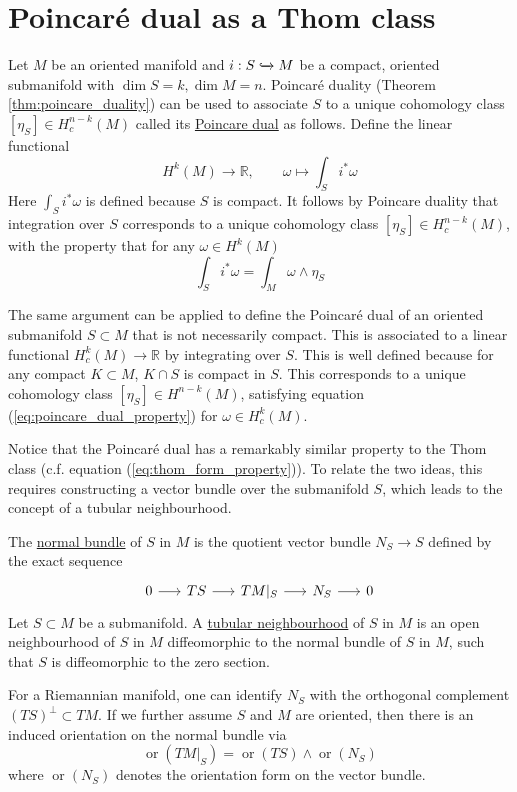 \section{Poincar\'e dual as a Thom class}
Let $M$ be an oriented manifold and $i: S \xhookrightarrow{} M$ be a compact,
oriented submanifold with $\dim S = k, \dim M = n$. 
Poincar\'e duality (Theorem \ref{thm:poincare_duality}) can be used to associate 
$S$ to a unique cohomology class $[\eta_S]\in H^{n-k}_c(M)$ called its
\underline{Poincare dual} as follows. Define the linear functional
\[
H^k(M) \to \mathbb{R}, \qquad 
\omega \mapsto \int_S i^*\omega
\] 
Here $\int_S i^*\omega$ is defined because $S$ is compact. 
It follows by Poincare duality that integration over $S$ corresponds to a
unique cohomology class $[\eta_S]\in H^{n-k}_c(M)$, with the property that 
for any $\omega\in H^k(M)$
\begin{equation} \label{eq:poincare_dual_property}
	\int_S i^*\omega = \int_M \omega \wedge \eta_S
\end{equation}
\begin{remark} %
	The same argument can be applied to define the Poincar\'e dual of an
	oriented submanifold $S \subset M$ that is not
	necessarily compact. This is associated to a linear functional 
	$H^k_c(M) \to \mathbb{R}$ by integrating over $S$. This is well defined
	because for any	compact $K\subset M$, $K\cap S$ is compact in $S$.
	This corresponds to a unique cohomology class $[\eta_S] \in H^{n-k}(M)$,
	satisfying equation (\ref{eq:poincare_dual_property}) for $\omega \in
	H^k_c(M)$.
\end{remark}
Notice that the Poincar\'e dual has a remarkably similar property to the 
Thom class (c.f. equation (\ref{eq:thom_form_property})). 
To relate the two ideas, this requires constructing a vector bundle over the
submanifold $S$, which leads to the concept of a tubular neighbourhood.
\begin{defn}
	The \underline{normal bundle} of $S$ in  $M$ is the quotient vector bundle
	$N_S\to S$ defined by the exact sequence 
	\[
	\begin{tikzcd}[column sep = 1.6em]
		0 \arrow[r] & TS \arrow[r] & TM|_S \arrow[r] 
						& N_S \arrow[r] & 0
	\end{tikzcd}
	\]
	Let $S \subset M$ be a submanifold. 
	A \underline{tubular neighbourhood} of  $S$ in  $M$ is an open
	neighbourhood of  $S$ in  $M$ diffeomorphic to the normal bundle of $S$ in
	 $M$, such that  $S$ is diffeomorphic to the zero section.
\end{defn}
For a Riemannian manifold, one can identify $N_S$ with the orthogonal
complement $(TS)^\perp \subset TM$. 
If we further assume $S$ and $M$ are oriented, then there is an
induced orientation on the normal bundle via 
\begin{equation} \label{eq:normal_orientation}
	\operatorname{or}(TM|_S) = \operatorname{or}(TS)\wedge \operatorname{or}(N_S)
\end{equation}
where $\operatorname{or}(N_S)$ denotes the orientation form on the vector bundle. 

